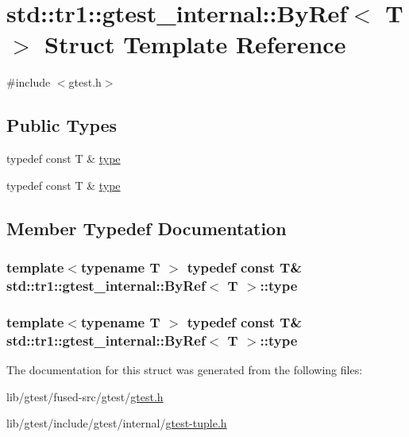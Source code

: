\hypertarget{structstd_1_1tr1_1_1gtest__internal_1_1_by_ref}{\section{std\-:\-:tr1\-:\-:gtest\-\_\-internal\-:\-:By\-Ref$<$ T $>$ Struct Template Reference}
\label{structstd_1_1tr1_1_1gtest__internal_1_1_by_ref}
}


{\ttfamily \#include $<$gtest.\-h$>$}

\subsection*{Public Types}
\begin{DoxyCompactItemize}
\item 
typedef const T \& \hyperlink{structstd_1_1tr1_1_1gtest__internal_1_1_by_ref_ac42ad942ee1cfa86b2abcce9b88ac10e}{type}
\item 
typedef const T \& \hyperlink{structstd_1_1tr1_1_1gtest__internal_1_1_by_ref_ac42ad942ee1cfa86b2abcce9b88ac10e}{type}
\end{DoxyCompactItemize}


\subsection{Member Typedef Documentation}
\hypertarget{structstd_1_1tr1_1_1gtest__internal_1_1_by_ref_ac42ad942ee1cfa86b2abcce9b88ac10e}{
\subsubsection[{type}]{\setlength{\rightskip}{0pt plus 5cm}template$<$typename T $>$ typedef const T\& {\bf std\-::tr1\-::gtest\-\_\-internal\-::\-By\-Ref}$<$ T $>$\-::{\bf type}}}\label{structstd_1_1tr1_1_1gtest__internal_1_1_by_ref_ac42ad942ee1cfa86b2abcce9b88ac10e}
\hypertarget{structstd_1_1tr1_1_1gtest__internal_1_1_by_ref_ac42ad942ee1cfa86b2abcce9b88ac10e}{
\subsubsection[{type}]{\setlength{\rightskip}{0pt plus 5cm}template$<$typename T $>$ typedef const T\& {\bf std\-::tr1\-::gtest\-\_\-internal\-::\-By\-Ref}$<$ T $>$\-::{\bf type}}}\label{structstd_1_1tr1_1_1gtest__internal_1_1_by_ref_ac42ad942ee1cfa86b2abcce9b88ac10e}


The documentation for this struct was generated from the following files\-:\begin{DoxyCompactItemize}
\item 
lib/gtest/fused-\/src/gtest/\hyperlink{fused-src_2gtest_2gtest_8h}{gtest.\-h}\item 
lib/gtest/include/gtest/internal/\hyperlink{gtest-tuple_8h}{gtest-\/tuple.\-h}\end{DoxyCompactItemize}
